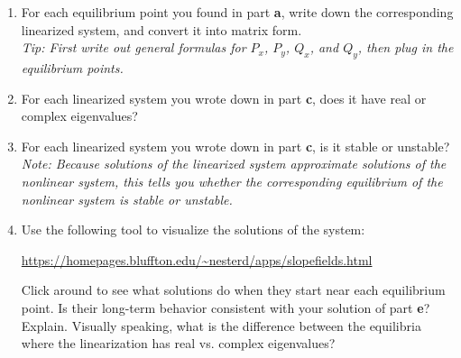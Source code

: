 \documentclass[10pt,psamsfonts,reqno,oneside,letterpaper]{amsart}
\begin{document}
\begin{enumerate}[I]
\begin{enumerate}
		\item For each equilibrium point you found in part \textbf{a}, write down the corresponding linearized system, and convert it into matrix form. \\
		\textit{Tip: First write out general formulas for $P_x$, $P_y$, $Q_x$, and $Q_y$, then plug in the equilibrium points.}
		\item  For each linearized system you wrote down in part \textbf{c}, does it have real or complex eigenvalues? 
		\item For each linearized system you wrote down in part \textbf{c}, is it stable or unstable? \\
		\textit{Note: Because solutions of the linearized system approximate solutions of the nonlinear system, this tells you whether the corresponding equilibrium of the nonlinear system is stable or unstable.}
		\item  Use the following tool to visualize the solutions of the system:
		\begin{center} \url{https://homepages.bluffton.edu/~nesterd/apps/slopefields.html} \end{center} 
		Click around to see what solutions do when they start near each equilibrium point.  Is their long-term behavior consistent with your solution of part \textbf{e}?  Explain.  Visually speaking, what is the difference between the equilibria where the linearization has real vs. complex eigenvalues? 
	\end{enumerate}
	\end{enumerate}	
\end{document}
